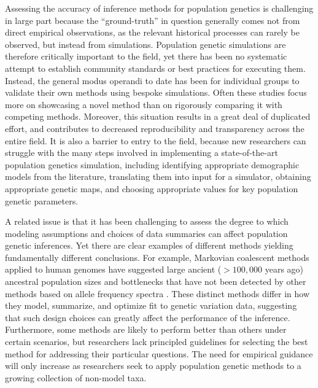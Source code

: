 \documentclass[12pt,halfline,a4paper]{ouparticle}
\begin{document}
Assessing the accuracy of inference methods for population genetics is
challenging in large part because the ``ground-truth'' in question
generally comes not from direct empirical observations, as the relevant
historical processes can rarely be observed, but instead from simulations.
Population genetic simulations are therefore critically important to the
field, yet there has been no systematic attempt to establish community
standards or best practices for executing them. Instead, the general modus
operandi to date has been for individual groups to validate their own
methods using bespoke simulations. 
Often these studies focus more on showcasing a novel method than on
rigorously comparing it with competing methods.
Moreover, this situation results in a great deal of duplicated effort,
and contributes to decreased reproducibility and transparency across the entire field.
It is also a barrier to entry to the field, because new researchers can
struggle with 
the many steps involved
in implementing a state-of-the-art population genetics simulation,
including identifying appropriate demographic models from the literature, 
translating them into input for a simulator, obtaining appropriate genetic
maps, and choosing appropriate values for key population genetic parameters.

A related issue is that it has been challenging to assess the degree to which modeling assumptions
and choices of data summaries can affect population
genetic inferences. Yet there
are clear examples of different methods yielding fundamentally
different conclusions. For example, Markovian coalescent methods applied to human genomes have
suggested large ancient ($>100,000$ years ago) ancestral population sizes and
bottlenecks that have not been detected by other methods based on allele frequency spectra
\citep[see][]{beichman2017comparison}.
These distinct methods differ in how they model, summarize, and optimize fit to
genetic variation data, suggesting that such design choices can greatly affect the
performance of the inference. Furthermore, some methods are likely to
perform better than others under certain scenarios, but 
researchers lack principled guidelines for selecting the best method for addressing 
their particular questions. The need for empirical
guidance will only increase as researchers 
seek to apply population genetic methods to a growing collection of non-model taxa.
\end{document}
